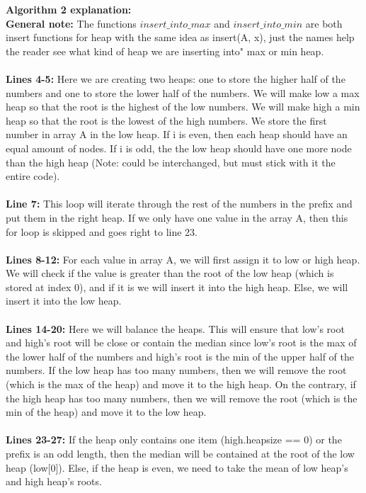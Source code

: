 \documentclass[11pt, a4paper]{article}
\begin{document}
\textbf{Algorithm 2 explanation:} \\
\textbf{General note:} The functions $insert\_into\_max$ and $insert\_into\_min$ are both insert functions for heap with the same idea as insert(A, x), just the names help the reader see what kind of heap we are inserting into" max or min heap. \\\\
\textbf{Lines 4-5:} Here we are creating two heaps: one to store the higher half of the numbers and one to store the lower half of the numbers. We will make low a max heap so that the root is the highest of the low numbers. We will make high a min heap so that the root is the lowest of the high numbers. We store the first number in array A in the low heap. If i is even, then each heap should have an equal amount of nodes. If i is odd, the the low heap should have one more node than the high heap (Note: could be interchanged, but must stick with it the entire code). 
\\\\
\textbf{Line 7: } This loop will iterate through the rest of the numbers in the prefix and put them in the right heap. If we only have one value in the array A, then this for loop is skipped and goes right to line 23.
\\\\
\textbf{Lines 8-12: } For each value in array A, we will first assign it to low or high heap. We will check if the value is greater than the root of the low heap (which is stored at index 0), and if it is we will insert it into the high heap. Else, we will insert it into the low heap.
\\\\
\textbf{Lines 14-20: } Here we will balance the heaps. This will ensure that low's root and high's root will be close or contain the median since low's root is the max of the lower half of the numbers and high's root is the min of the upper half of the numbers. If the low heap has too many numbers, then we will remove the root (which is the max of the heap) and move it to the high heap. On the contrary, if the high heap has too many numbers, then we will remove the root (which is the min of the heap) and move it to the low heap.
\\\\
\textbf{Lines 23-27: } If the heap only contains one item (high.heapsize == 0) or the prefix is an odd length, then the median will be contained at the root of the low heap (low[0]). Else, if the heap is even, we need to take the mean of low heap's and high heap's roots.
\end{document}
